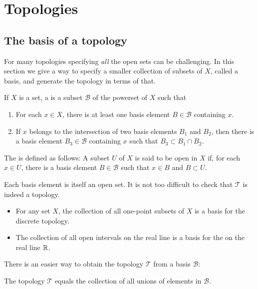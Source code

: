 \section{Topologies}
\subsection{The basis of a topology}
For many topologies specifying \textit{all} the open sets can be challenging. In this section we give a way to specify a smaller collection of subsets of $X$, called a basis, and generate the topology in terms of that.

\begin{definition}
If $X$ is a set, a  is a subset $\mathcal{B}$ of the powerset of $X$ such that
\begin{enumerate}
\item For each $x\in X$, there is at least one basis element $B\in\mathcal{B}$ containing $x$.
\item If $x$ belongs to the intersection of two basis elements $B_1$ and $B_2$, then there is a basis element $B_3\in\mathcal{B}$ containing $x$ such that $B_3\subset B_1 \cap B_2$.
\end{enumerate}
The  is defined as follows: A subset $U$ of $X$ is said to be open in $X$ if, for each $x\in U$, there is a basis element $B\in\mathcal{B}$ such that $x\in B$ and $B\subset U$. 
\end{definition}
Each basis element is itself an open set. It is not too difficult to check that $\mathcal{T}$ is indeed a topology.

\begin{example}
\begin{itemize}
\item For any set $X$, the collection of all one-point subsets of $X$ is a basis for the discrete topology.
\item The collection of all open intervals on the real line is a basis for the  on the real line $\mathbb{R}$.
\end{itemize}
\end{example}

There is an easier way to obtain the topology $\mathcal{T}$ from a basis $\mathcal{B}$:
\begin{lemma}
The topology $\mathcal{T}$ equals the collection of all unions of elements in $\mathcal{B}$.
\end{lemma}

